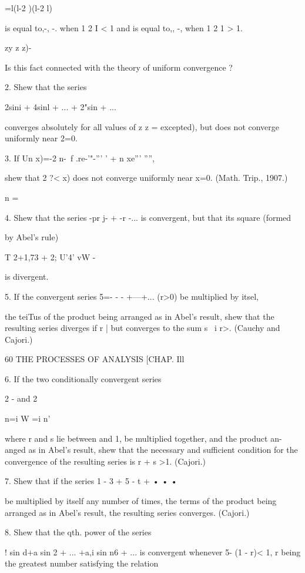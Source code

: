  =l(l-2 )(l-2 l)

is equal to,-, -. when 1 2 I < 1 and is equal to,, -, when 1 2 1 >
1.

  zy z z)-

Is this fact connected with the theory of uniform convergence ?

2. Shew that the series

2sini + 4sinl + ... + 2"sin + ...

converges absolutely for all values of z z = excepted), but does not
converge uniformly near 2=0.

3. If Un x)=-2 n-\ f .re-'"-''' ' + n xe''' '''',

shew that 2 ?< x) does not converge uniformly near x=0. (Math. Trip.,
1907.)

n = \

4. Shew that the series -pr j- + -r -... is convergent, but that its
square (formed

by Abel's rule)

T 2+1,73 + 2; U'4' vW -

is divergent.

5. If the convergent series 5=- - - +---+... (r>0) be multiplied by
itsel,

the teiTus of the product being arranged as in Abel's result, shew
that the resulting series diverges if r | but converges to the sum s \
i r>. (Cauchy and Cajori.)



60 THE PROCESSES OF ANALYSIS [CHAP. Ill

6. If the two conditionally convergent series

2 - and 2



n=i W =i n'

where r and s lie between and 1, be multiplied together, and the
product an-anged as in Abel's result, shew that the necessary and
sufficient condition for the convergence of the resulting series is r
+ s >1. (Cajori.)

7. Shew that if the series 1 - 3 + 5 - t + • • •

be multiplied by itself any number of times, the terms of the product
being arranged as in Abel's result, the resulting series converges.
(Cajori.)

8. Shew that the qth. power of the series

 ! sin d+a sin 2 + ... +a,i sin n6 + ... is convergent whenever 5- (1
- r)< 1, r being the greatest number satisfying the relation

